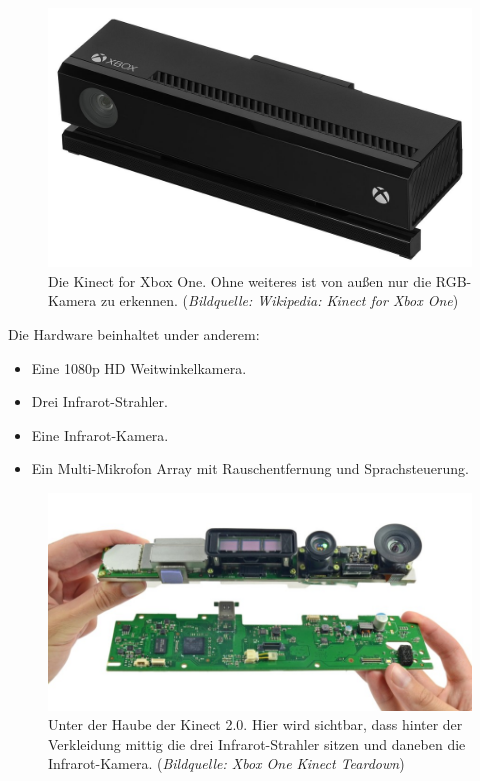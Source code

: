 \documentclass[12pt,a4paper,ngerman]{scrartcl}
\begin{document}
\begin{figure}[H]
    \centering
    \includegraphics[scale=1]{img/kinect2.jpg}
    \caption{Die Kinect for Xbox One. Ohne weiteres ist von außen nur die RGB-Kamera zu erkennen. ({\em Bildquelle: Wikipedia: Kinect for Xbox One\cite{kinect2:wikikinect}})}
\end{figure}

Die Hardware beinhaltet under anderem:
\begin{itemize}
\item Eine 1080p HD Weitwinkelkamera.\cite{kinect2:teardown}
\item Drei Infrarot-Strahler.\cite{kinect2:infrared}
\item Eine Infrarot-Kamera.\cite{kinect2:teardown}
\item Ein Multi-Mikrofon Array mit Rauschentfernung und Sprachsteuerung.\cite{kinect2:teardown}
\end{itemize}

\begin{figure}[H]
    \centering
    \includegraphics[scale=0.7]{img/kinect2_components.jpg}
    \caption{Unter der Haube der Kinect 2.0. Hier wird sichtbar, dass hinter der Verkleidung mittig die drei Infrarot-Strahler sitzen und daneben die Infrarot-Kamera. ({\em Bildquelle: Xbox One Kinect Teardown\cite{kinect2:teardown}})}
\end{figure}
\end{document}
